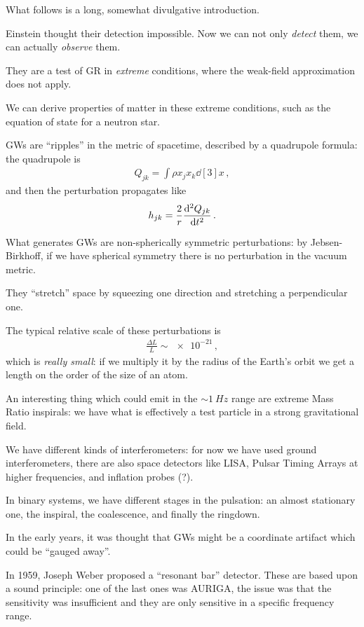 \documentclass[main.tex]{subfiles}
\begin{document}
What follows is a long, somewhat divulgative introduction.

Einstein thought their detection impossible. 
Now we can not only \emph{detect} them, we can actually \emph{observe} them.

They are a test of GR in \emph{extreme} conditions, where the weak-field approximation does not apply.

We can derive properties of matter in these extreme conditions, such as the equation of state for a neutron star.

GWs are ``ripples'' in the metric of spacetime, described by a quadrupole formula: the quadrupole is 
%
\begin{align}
Q_{jk} = \int \rho x_{j} x_{k} \dd[3]{x}
\,,
\end{align}
%
and then the perturbation propagates like 
%
\begin{align}
h_{jk} = \frac{2}{r} \dv[2]{Q_{jk}}{t}
\,.
\end{align}

What generates GWs are non-spherically symmetric perturbations: by Jebsen-Birkhoff, if we have spherical symmetry there is no perturbation in the vacuum metric.

They ``stretch'' space by squeezing one direction and stretching a perpendicular one.

The typical relative scale of these perturbations is 
%
\begin{align}
\frac{\Delta L}{L} \sim \num{e-21}
\,,
\end{align}
%
which is \emph{really small}: if we multiply it by the radius of the Earth's orbit we get a length on the order of the size of an atom.

An interesting thing which could emit in the \(\sim \SI{1}{Hz}\) range are extreme Mass Ratio inspirals: we have what is effectively a test particle in a strong gravitational field.

We have different kinds of interferometers: for now we have used ground interferometers, there are also space detectors like LISA, Pulsar Timing Arrays at higher frequencies, and inflation probes (?).

In binary systems, we have different stages in the pulsation: an almost stationary one, the inspiral, the coalescence, and finally the ringdown.

In the early years, it was thought that GWs might be a coordinate artifact which could be ``gauged away''.

In 1959, Joseph Weber proposed a ``resonant bar'' detector. These are based upon a sound principle: one of the last ones was AURIGA, the issue was that the sensitivity was insufficient and they are only sensitive in a specific frequency range.
\end{document}
